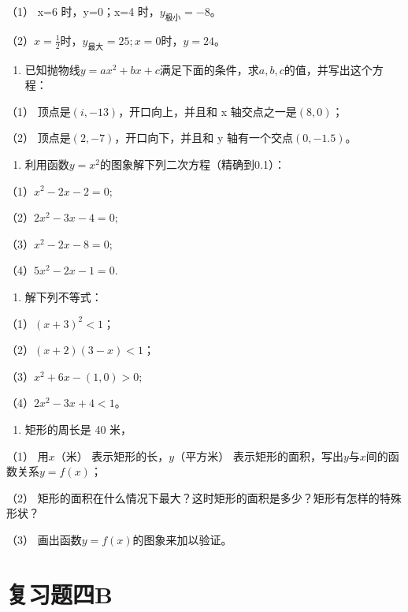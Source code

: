 （1） x=6 时，y=0；x=4 时，\(y_{\text{极小}}=-8\)。

（2）\(x = \frac{1}{2}\)时，\(y_{\text{最大}} = 25; x = 0\)时，\(y = 24\)。

\begin{enumerate}[start=15]
\item
  已知抛物线\(y = ax^2 + bx + c\)满足下面的条件，求\(a, b, c\)的值，并写出这个方程：
\end{enumerate}

（1） 顶点是\((i, -13)\)，开口向上，并且和 x 轴交点之一是\((8, 0)\)；

（2） 顶点是\((2, -7)\)，开口向下，并且和 y 轴有一个交点\((0, -1.5)\)。

\begin{enumerate}[start=16]
\item
  利用函数\(y = x^2\)的图象解下列二次方程（精确到0.1）：
\end{enumerate}

（1）\(x^{2} - 2x - 2 = 0;\)

（2）\(2x^{2} - 3x - 4 = 0;\)

（3）\(x^{2} - 2x - 8 = 0;\)

（4）\(5x^{2} - 2x - 1 = 0.\)

\begin{enumerate}[start=17]
\item
  解下列不等式：
\end{enumerate}

（1）\((x + 3)^{2} < 1\)；

（2）\((x + 2)(3 - x) < 1\)；

（3）\(x^{2} + 6x - (1,0) > 0;\)

（4）\(2x^{2} - 3x + 4 < 1\)。

\begin{enumerate}[start=18]
\item
  矩形的周长是 40 米，
\end{enumerate}

（1） 用\(x\)（米） 表示矩形的长，\(y\)（平方米）
表示矩形的面积，写出\(y\)与\(x\)间的函数关系\(y = f(x)\)；

（2）
矩形的面积在什么情况下最大？这时矩形的面积是多少？矩形有怎样的特殊形状？

（3） 画出函数\(y = f(x)\)的图象来加以验证。

\section{复习题四B}

